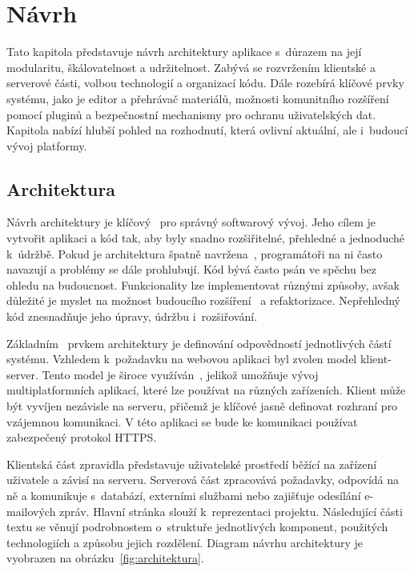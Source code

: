 \chapter{Návrh}\label{text:navrh}

\begin{chapterabstract}
Tato kapitola představuje návrh architektury aplikace s~důrazem na její modularitu, škálovatelnost a udržitelnost. 
Zabývá se rozvržením klientské a serverové části, volbou technologií a organizací kódu. 
Dále rozebírá klíčové prvky systému, jako je editor a přehrávač materiálů, možnosti komunitního rozšíření pomocí pluginů a bezpečnostní mechanismy pro ochranu uživatelských dat. 
Kapitola nabízí hlubší pohled na rozhodnutí, která ovlivní aktuální, ale i~budoucí vývoj platformy.
\end{chapterabstract}

\section{Architektura}

Návrh architektury je klíčový~\cite{uml_2007} pro správný softwarový vývoj. 
Jeho cílem je vytvořit aplikaci a kód tak, aby byly snadno rozšiřitelné, přehledné a jednoduché k~údržbě. 
Pokud je architektura špatně navržena~\cite{uml_2007}, programátoři na ni často navazují a problémy se dále prohlubují.
Kód bývá často psán ve spěchu bez ohledu na budoucnost. 
Funkcionality lze implementovat různými způsoby, avšak důležité je myslet na možnost budoucího rozšíření~\cite{sutherland_2014} a refaktorizace. 
Nepřehledný kód znesnadňuje jeho úpravy, údržbu i~rozšiřování.

Základním~\cite{richards_2020} prvkem architektury je definování odpovědností jednotlivých částí systému. 
Vzhledem k~požadavku na webovou aplikaci byl zvolen model klient-server. 
Tento model je široce využíván~\cite{richards_2020, uzayr2022frontend}, jelikož umožňuje vývoj multiplatformních aplikací, které lze používat na různých zařízeních. 
Klient může být vyvíjen nezávisle na serveru, přičemž je klíčové jasně definovat rozhraní pro vzájemnou komunikaci. 
V této aplikaci se bude ke komunikaci používat zabezpečený protokol HTTPS.

Klientská část zpravidla představuje uživatelské prostředí běžící na zařízení uživatele a závisí na serveru. 
Serverová část zpracovává požadavky, odpovídá na ně a komunikuje s~databází, externími službami nebo zajišťuje odesílání e-mailových zpráv. 
Hlavní stránka slouží k~reprezentaci projektu.
Následující části textu se věnují podrobnostem o~struktuře jednotlivých komponent, použitých technologiích a způsobu jejich rozdělení. 
Diagram návrhu architektury je vyobrazen na obrázku~\ref{fig:architektura}.

